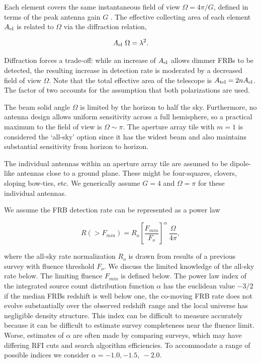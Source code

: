 \documentclass[fleqn,usenatbib]{mnras}
\begin{document}
Each element covers the same instantaneous field of view $\Omega=4\pi/G$, defined in terms of the peak antenna gain $G$ \citep{era}. The effective collecting area of each element $A_{\rm{el}}$ is related to $\Omega$ via the diffraction relation,

\begin{equation}
		A_{\rm{el}} ~\Omega =\lambda^2.
\end{equation}

Diffraction forces a trade-off: while an increase of $A_{\rm{el}}$ allows dimmer FRBs to be detected, the resulting increase in detection rate is moderated by a decreased field of view $\Omega$. Note that the total effective area of the telescope is $ A_{\rm{tel}}= 2 n A_{\rm{el}}$. The factor of two accounts for the assumption that both polarizations are used.

The beam solid angle $\Omega$ is limited by the horizon to half the sky. Furthermore, no antenna design allows uniform sensitivity across a full hemisphere, so a practical maximum to the field of view is  $\Omega \sim \pi$. The aperture array tile with $m=1$ is considered the `all-sky' option since it has the widest beam and also maintains substantial sensitivity from horizon to horizon.

The individual antennas within an aperture array tile are assumed to be dipole-like antennas close to a ground plane. These might be four-squares, clovers, sloping bow-ties, etc.  We generically assume $G=4$ and $\Omega = \pi$ for these individual antennas.

We assume the FRB detection rate can be represented as a power law

\begin{equation}
	R(>F_{min}) = R_o \left[ \frac{F_{min} }{F_o} \right] ^\alpha  ~\frac{\Omega}{4 \pi},
\end{equation}

where the all-sky rate normalization $R_o$ is drawn from results of a previous survey with fluence threshold $F_o $. We discuss the limited knowledge of the all-sky rate below. The limiting fluence $F_{min}$ is defined below.
The power law index of the integrated source count distribution function $\alpha $ has the euclidean value $-3/2$ if the median FRBs  redshift is well below one, the co-moving FRB rate does not evolve substantially over the observed redshift range and the local universe has negligible density structure. This index can be difficult to measure accurately because it can be difficult to estimate survey completeness near the fluence limit. Worse, estimates of $\alpha$ are often made by comparing surveys, which may have differing RFI cuts and search algorithm efficiencies.  To accommodate a range of possible indices we consider $\alpha = -1.0, -1.5, ~-2.0$.
\end{document}
